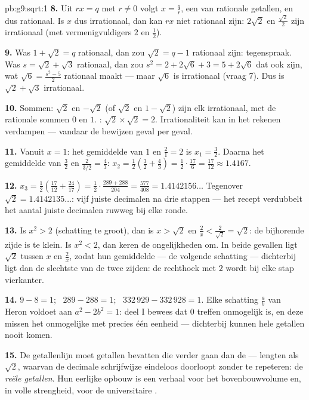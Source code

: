 \begin{solution}{pb:g9:sqrt:1}
\textbf{8.} Uit $r x = q$ met $r \neq 0$ volgt $x = \frac qr$, een  van
rationale getallen, en dus rationaal. Is $x$ dus irrationaal, dan kan $r x$ niet
rationaal zijn: $2\sqrt2$ en $\frac{\sqrt2}{2}$ zijn irrationaal (met
vermenigvuldigers $2$ en $\frac12$).

\textbf{9.} Was $1 + \sqrt2 = q$ rationaal, dan zou $\sqrt2 = q - 1$ rationaal
zijn: tegenspraak. Was $s = \sqrt2 + \sqrt3$ rationaal, dan zou
$s^2 = 2 + 2\sqrt6 + 3 = 5 + 2\sqrt6$ dat ook zijn, wat
$\sqrt6 = \frac{s^2 - 5}{2}$ rationaal maakt --- maar $\sqrt6$ is irrationaal
(vraag 7). Dus is $\sqrt2 + \sqrt3$ irrationaal.

\textbf{10.} Sommen: $\sqrt2$ en $-\sqrt2$ (of $\sqrt2$ en $1 - \sqrt2$) zijn elk
irrationaal, met de rationale sommen $0$ en $1$. :
$\sqrt2 \times \sqrt2 = 2$. Irrationaliteit kan in het rekenen verdampen ---
vandaar de bewijzen geval per geval.

\textbf{11.} Vanuit $x = 1$: het gemiddelde van $1$ en $\frac21 = 2$ is
$x_1 = \frac32$. Daarna het gemiddelde van $\frac32$ en
$\frac{2}{3/2} = \frac43$:
$x_2 = \frac12\left(\frac32 + \frac43\right)
= \frac12 \cdot \frac{17}{6} = \frac{17}{12} \approx 1.4167$.

\textbf{12.} $x_3 = \frac12\left(\frac{17}{12} + \frac{24}{17}\right)
= \frac12 \cdot \frac{289 + 288}{204} = \frac{577}{408} = 1.4142156\ldots$
Tegenover $\sqrt2 = 1.4142135\ldots$: vijf juiste decimalen na drie stappen ---
het recept verdubbelt het aantal juiste decimalen ruwweg bij elke ronde.

\textbf{13.} Is $x^2 > 2$ (schatting te groot), dan is $x > \sqrt2$ en
$\frac2x < \frac{2}{\sqrt2} = \sqrt2$: de bijhorende zijde is te klein. Is
$x^2 < 2$, dan keren de ongelijkheden om. In beide gevallen ligt $\sqrt2$ tussen
$x$ en $\frac2x$, zodat hun gemiddelde --- de volgende schatting --- dichterbij
ligt dan de slechtste van de twee zijden: de rechthoek met  $2$ wordt
bij elke stap vierkanter.

\textbf{14.} $9 - 8 = 1$; \ $289 - 288 = 1$; \ $332\,929 - 332\,928 = 1$. Elke
schatting $\frac ab$ van Heron voldoet aan $a^2 - 2b^2 = 1$: deel I bewees dat
$0$ treffen onmogelijk is, en deze  missen het onmogelijke met precies één
eenheid --- dichterbij kunnen hele getallen nooit komen.

\textbf{15.} De getallenlijn moet getallen bevatten die verder gaan dan de 
--- lengten als $\sqrt2$, waarvan de decimale schrijfwijze eindeloos doorloopt
zonder te repeteren: de \emph{reële getallen}. Hun eerlijke opbouw is een verhaal
voor het bovenbouwvolume en, in volle strengheid, voor de universitaire .
\end{solution}
